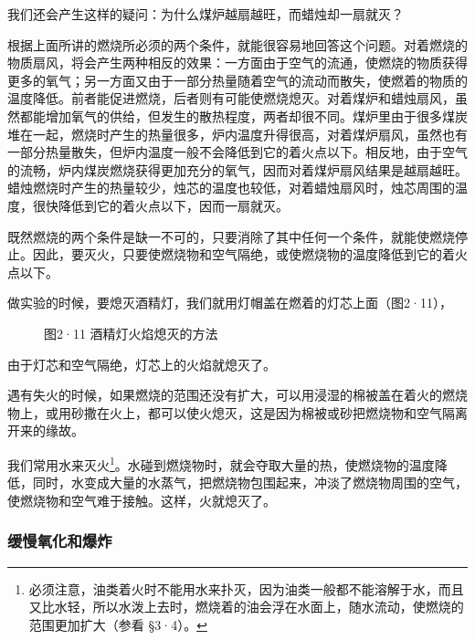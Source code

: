 我们还会产生这样的疑问：为什么煤炉越扇越旺，而蜡烛却一扇就灭？

根据上面所讲的燃烧所必须的两个条件，就能很容易地回答这个问题。对着燃烧的物质扇风，将会产生两种相反的效果：一方面由于空气的流通，使燃烧的物质获得更多的氧气；另一方面又由于一部分热量随着空气的流动而散失，使燃着的物质的温度降低。前者能促进燃烧，后者则有可能使燃烧熄灭。对着煤炉和蜡烛扇风，虽然都能增加氧气的供给，但发生的散热程度，两者却很不同。煤炉里由于很多煤炭堆在一起，燃烧时产生的热量很多，炉内温度升得很高，对着煤炉扇风，虽然也有一部分热量散失，但炉内温度一般不会降低到它的着火点以下。相反地，由于空气的流畅，炉内煤炭燃烧获得更加充分的氧气，因而对着煤炉扇风结果是越扇越旺。蜡烛燃烧时产生的热量较少，烛芯的温度也较低，对着蜡烛扇风时，烛芯周围的温度，很快降低到它的着火点以下，因而一扇就灭。

既然燃烧的两个条件是缺一不可的，只要消除了其中任何一个条件，就能使燃烧停止。因此，要灭火，只要使燃烧物和空气隔绝，或使燃烧物的温度降低到它的着火点以下。

做实验的时候，要熄灭酒精灯，我们就用灯帽盖在燃着的灯芯上面（图2·11），

\begin{figure}
\centering
\caption{图2·11 酒精灯火焰熄灭的方法}
\end{figure}

由于灯芯和空气隔绝，灯芯上的火焰就熄灭了。

遇有失火的时候，如果燃烧的范围还没有扩大，可以用浸湿的棉被盖在着火的燃烧物上，或用砂撒在火上，都可以使火熄灭，这是因为棉被或砂把燃烧物和空气隔离开来的缘故。

我们常用水来灭火\footnote{必须注意，油类着火时不能用水来扑灭，因为油类一般都不能溶解于水，而且又比水轻，所以水泼上去时，燃烧着的油会浮在水面上，随水流动，使燃烧的范围更加扩大（参看
  §3·4）。}。水碰到燃烧物时，就会夺取大量的热，使燃烧物的温度降低，同时，水变成大量的水蒸气，把燃烧物包围起来，冲淡了燃烧物周围的空气，使燃烧物和空气难于接触。这样，火就熄灭了。

\subsubsection{缓慢氧化和爆炸}

